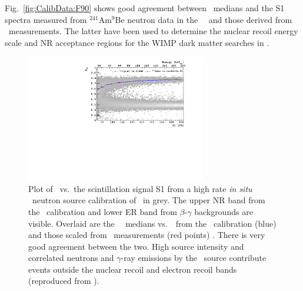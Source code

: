 Fig.~\ref{fig:CalibData:F90} shows good agreement between \FNinety\ medians and the S1 spectra measured from $^{241}$Am$^9$Be neutron data in the \dsf\ \tpc\ and those derived from \SCENE\ measurements. The latter have been used to determine the nuclear recoil energy scale and NR acceptance regions for the WIMP dark matter searches in \cite{Agnes:2015gu, Agnes:2015_uar}.
\begin{figure}[htbp]
\centering
\includegraphics[width=0.7\textwidth]{./Figures/DSf-UArAmBeDMSStCut.pdf}
\caption{Plot of \FNinety\ vs.~the scintillation signal S1 from a high rate {\it in situ} \AmBe\ neutron source calibration of \dsf\ in grey. The upper NR band from the \AmBe\ calibration and lower ER band from $\beta$-$\gamma$ backgrounds are visible. Overlaid are the \FNinety\ \NR\ medians vs.~\SOne\ from the \AmBe\ calibration (blue) and those scaled from \SCENE\ measurements (red points) \cite{Cao:2015ks}. There is very good agreement between the two.  High source intensity and correlated neutrons and $\gamma$-ray emissions by the \AmBe\ source contribute events outside the nuclear recoil and electron recoil bands (reproduced from \cite{Agnes:2015_uar}).\label{fig:CalibData:F90}\label{fig:DSf-UArAmBeDMS}} 
\end{figure}


